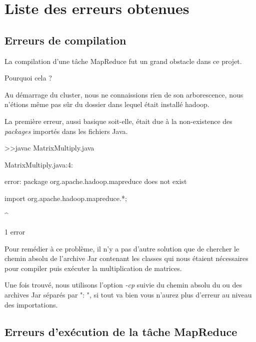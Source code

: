\section{Liste des erreurs obtenues}
\subsection{Erreurs de compilation}

La compilation d'une tâche MapReduce fut un grand obstacle dans ce projet.\par
Pourquoi cela ?\par
Au démarrage du cluster, nous ne connaissions rien de son arborescence, nous n'étions même pas sûr du dossier dans lequel était installé hadoop.\par
\vspace{1\baselineskip}
La première erreur, aussi basique soit-elle, était due à la non-existence des \textit{packages} importés dans les fichiers Java.\par

\begin{ttfamily}\small
>>javac MatrixMultiply.java
\par MatrixMultiply.java:4:\par
error: package org.apache.hadoop.mapreduce does not exist\par
import org.apache.hadoop.mapreduce.*;\par
\^{}\par
1 error
\end{ttfamily}

Pour remédier à ce problème, il n'y a pas d'autre solution que de chercher le chemin absolu de l'archive Jar contenant les classes qui nous étaient nécessaires pour compiler puis exécuter la multiplication de matrices.\par
Une fois trouvé, nous utilisons l'option \textit{-cp} suivie du chemin absolu du ou des archives Jar séparés par ": ", si tout va bien vous n'aurez plus d'erreur au niveau des importations.
\vspace{1.5\baselineskip}



\subsection{Erreurs d'exécution de la tâche MapReduce}

